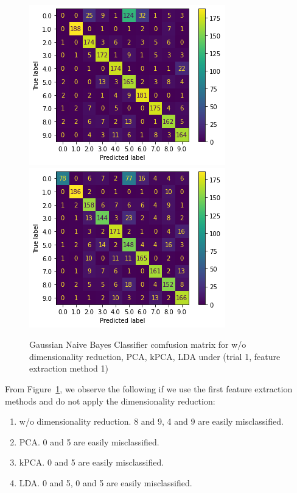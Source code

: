 \documentclass{article}
\begin{document}
\begin{figure}[!htb]
  \includegraphics[width=\linewidth]{figure/nb_kpca.png}
\endminipage\hfill
{}
  \includegraphics[width=\linewidth]{figure/nb_lda.png}
\endminipage
\caption{Gaussian Naive Bayes Classifier comfusion matrix for w/o dimensionality reduction, PCA, kPCA, LDA under (trial 1, feature extraction method 1)}
\label{nb_cm}
\end{figure}

From Figure~\ref{nb_cm}, we observe the following if we use the first feature extraction methods and do not apply the dimensionality reduction:
\begin{enumerate}
    \item w/o dimensionality reduction. 8 and 9, 4 and 9 are easily misclassified.
    \item PCA. 0 and 5 are easily misclassified.
    \item kPCA. 0 and 5 are easily misclassified.
    \item LDA. 0 and 5, 0 and 5 are easily misclassified.
\end{enumerate}
\end{document}

